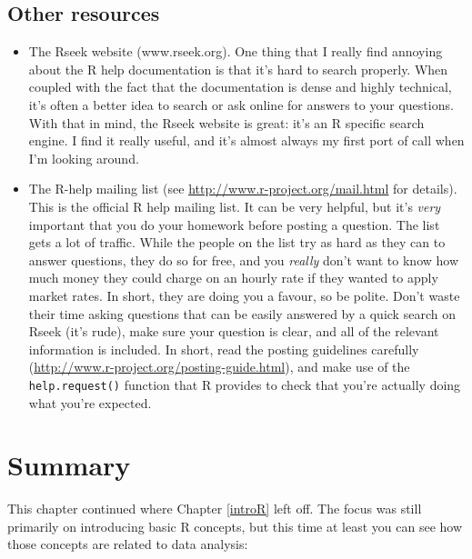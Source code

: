 \documentclass[
]{book}
\providecommand{\tightlist}{%
  \setlength{\itemsep}{0pt}\setlength{\parskip}{0pt}}
\begin{document}
\hypertarget{other-resources}{%
\subsection{Other resources}\label{other-resources}}

\begin{itemize}
\tightlist
\item
  The Rseek website (www.rseek.org). One thing that I really find annoying about the R help documentation is that it's hard to search properly. When coupled with the fact that the documentation is dense and highly technical, it's often a better idea to search or ask online for answers to your questions. With that in mind, the Rseek website is great: it's an R specific search engine. I find it really useful, and it's almost always my first port of call when I'm looking around.
\item
  The R-help mailing list (see \url{http://www.r-project.org/mail.html} for details). This is the official R help mailing list. It can be very helpful, but it's \emph{very} important that you do your homework before posting a question. The list gets a lot of traffic. While the people on the list try as hard as they can to answer questions, they do so for free, and you \emph{really} don't want to know how much money they could charge on an hourly rate if they wanted to apply market rates. In short, they are doing you a favour, so be polite. Don't waste their time asking questions that can be easily answered by a quick search on Rseek (it's rude), make sure your question is clear, and all of the relevant information is included. In short, read the posting guidelines carefully (\url{http://www.r-project.org/posting-guide.html}), and make use of the \texttt{help.request()} function that R provides to check that you're actually doing what you're expected.
\end{itemize}

\hypertarget{summary-1}{%
\section{Summary}\label{summary-1}}

This chapter continued where Chapter \ref{introR} left off. The focus was still primarily on introducing basic R concepts, but this time at least you can see how those concepts are related to data analysis:
\end{document}
